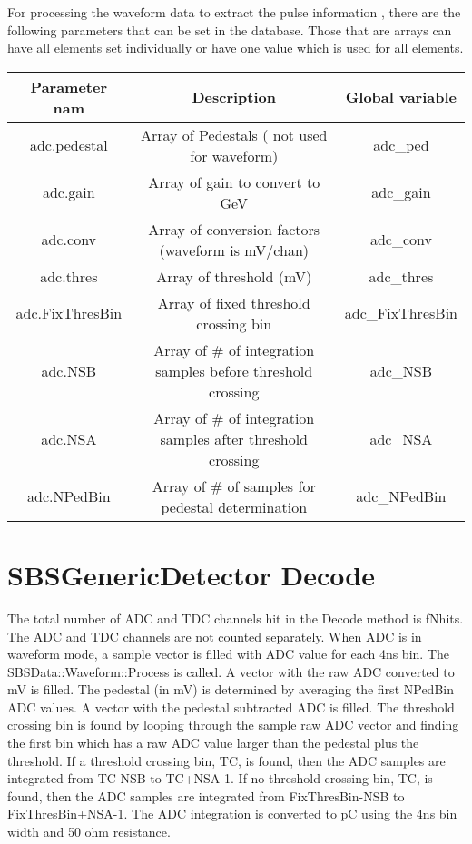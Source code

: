 \documentclass[11pt]{article}
\begin{document}
For processing the waveform data to extract the pulse information , there are the following parameters
that can be set in the database. Those that are arrays can have all elements set individually or have one value which is used for all elements.


\begin{center}
	\begin{tabular}{|c|c|c|}
		\hline 
		Parameter nam	& Description &  Global variable\\ 
		\hline 
		adc.pedestal	& Array of Pedestals ( not used for waveform) & adc\_ped \\ 
		\hline 
		adc.gain	& Array of gain to convert to GeV & adc\_gain\\ 
		\hline 
        adc.conv	& Array of conversion factors  (waveform is mV/chan) & adc\_conv\\ 
		\hline 
adc.thres	& Array of threshold  (mV) & adc\_thres\\ 
\hline 
adc.FixThresBin	& Array of fixed threshold crossing bin  & adc\_FixThresBin\\ 
\hline 
adc.NSB	& Array of \# of integration samples before threshold crossing  & adc\_NSB\\ 
\hline 
adc.NSA	& Array of \# of integration samples after threshold crossing  & adc\_NSA\\ 
\hline 
adc.NPedBin	& Array of \# of samples for pedestal determination  & adc\_NPedBin\\ 
\hline 
	\end{tabular} 
\end{center}


 


\section{SBSGenericDetector Decode}
The total number of  ADC and TDC channels hit in the Decode method is fNhits. The ADC and TDC channels
are not counted separately. When ADC is in waveform mode, a sample vector is filled with ADC value for
each 4ns bin. The SBSData::Waveform::Process is called.
A vector with the raw ADC converted to mV is filled. The pedestal (in mV) is determined by averaging the first NPedBin ADC values. A vector with the pedestal subtracted ADC is filled.
The threshold crossing bin is found by looping through the sample raw ADC vector and finding the first bin which has a raw ADC value larger than the pedestal plus the threshold.
If a threshold crossing bin, TC, is found, then the ADC samples are integrated from TC-NSB to TC+NSA-1.
If no  threshold crossing bin, TC, is found, then the ADC samples are integrated from FixThresBin-NSB to FixThresBin+NSA-1.
The ADC integration is converted to pC using the 4ns bin width and 50 ohm resistance.
\end{document}
